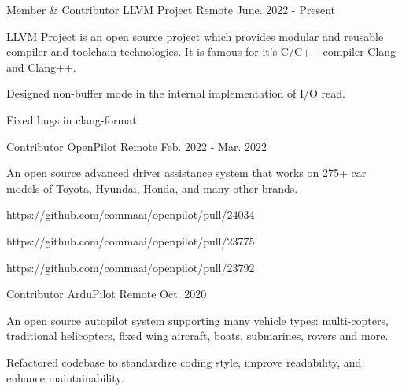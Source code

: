 

\begin{cventries}

  \cventry
    {Member \& Contributor} %
    {LLVM Project} %
    {Remote} %
    {June. 2022 - Present} %
    {
      \begin{cvitems} %
        \item {LLVM Project is an open source project which provides modular and reusable compiler and toolchain technologies. It is famous for it's C/C++ compiler Clang and Clang++.}
        \item {Designed non-buffer mode in the internal implementation of I/O read.}
        \item {Fixed bugs in clang-format.}
      \end{cvitems}
    }

  \cventry
    {Contributor} %
    {OpenPilot} %
    {Remote} %
    {Feb. 2022 - Mar. 2022} %
    {
      \begin{cvitems} %
        \item {An open source advanced driver assistance system that works on 275+ car models of Toyota, Hyundai, Honda, and many other brands.}
        \item {https://github.com/commaai/openpilot/pull/24034}
        \item {https://github.com/commaai/openpilot/pull/23775}
        \item {https://github.com/commaai/openpilot/pull/23792}
      \end{cvitems}
    }

  \cventry
    {Contributor} %
    {ArduPilot} %
    {Remote} %
    {Oct. 2020} %
    {
      \begin{cvitems} %
        \item {An open source autopilot system supporting many vehicle types: multi-copters, traditional helicopters, fixed wing aircraft, boats, submarines, rovers and more.}
        \item {Refactored codebase to standardize coding style, improve readability, and enhance maintainability.}
      \end{cvitems}
    }


\end{cventries}
